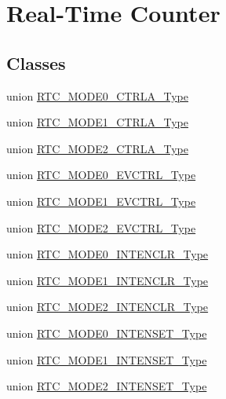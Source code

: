 \hypertarget{group___s_a_m_l21___r_t_c}{}\section{Real-\/\+Time Counter}
\label{group___s_a_m_l21___r_t_c}
\subsection*{Classes}
\begin{DoxyCompactItemize}
\item 
union \hyperlink{union_r_t_c___m_o_d_e0___c_t_r_l_a___type}{R\+T\+C\+\_\+\+M\+O\+D\+E0\+\_\+\+C\+T\+R\+L\+A\+\_\+\+Type}
\item 
union \hyperlink{union_r_t_c___m_o_d_e1___c_t_r_l_a___type}{R\+T\+C\+\_\+\+M\+O\+D\+E1\+\_\+\+C\+T\+R\+L\+A\+\_\+\+Type}
\item 
union \hyperlink{union_r_t_c___m_o_d_e2___c_t_r_l_a___type}{R\+T\+C\+\_\+\+M\+O\+D\+E2\+\_\+\+C\+T\+R\+L\+A\+\_\+\+Type}
\item 
union \hyperlink{union_r_t_c___m_o_d_e0___e_v_c_t_r_l___type}{R\+T\+C\+\_\+\+M\+O\+D\+E0\+\_\+\+E\+V\+C\+T\+R\+L\+\_\+\+Type}
\item 
union \hyperlink{union_r_t_c___m_o_d_e1___e_v_c_t_r_l___type}{R\+T\+C\+\_\+\+M\+O\+D\+E1\+\_\+\+E\+V\+C\+T\+R\+L\+\_\+\+Type}
\item 
union \hyperlink{union_r_t_c___m_o_d_e2___e_v_c_t_r_l___type}{R\+T\+C\+\_\+\+M\+O\+D\+E2\+\_\+\+E\+V\+C\+T\+R\+L\+\_\+\+Type}
\item 
union \hyperlink{union_r_t_c___m_o_d_e0___i_n_t_e_n_c_l_r___type}{R\+T\+C\+\_\+\+M\+O\+D\+E0\+\_\+\+I\+N\+T\+E\+N\+C\+L\+R\+\_\+\+Type}
\item 
union \hyperlink{union_r_t_c___m_o_d_e1___i_n_t_e_n_c_l_r___type}{R\+T\+C\+\_\+\+M\+O\+D\+E1\+\_\+\+I\+N\+T\+E\+N\+C\+L\+R\+\_\+\+Type}
\item 
union \hyperlink{union_r_t_c___m_o_d_e2___i_n_t_e_n_c_l_r___type}{R\+T\+C\+\_\+\+M\+O\+D\+E2\+\_\+\+I\+N\+T\+E\+N\+C\+L\+R\+\_\+\+Type}
\item 
union \hyperlink{union_r_t_c___m_o_d_e0___i_n_t_e_n_s_e_t___type}{R\+T\+C\+\_\+\+M\+O\+D\+E0\+\_\+\+I\+N\+T\+E\+N\+S\+E\+T\+\_\+\+Type}
\item 
union \hyperlink{union_r_t_c___m_o_d_e1___i_n_t_e_n_s_e_t___type}{R\+T\+C\+\_\+\+M\+O\+D\+E1\+\_\+\+I\+N\+T\+E\+N\+S\+E\+T\+\_\+\+Type}
\item 
union \hyperlink{union_r_t_c___m_o_d_e2___i_n_t_e_n_s_e_t___type}{R\+T\+C\+\_\+\+M\+O\+D\+E2\+\_\+\+I\+N\+T\+E\+N\+S\+E\+T\+\_\+\+Type}

\end{DoxyCompactItemize}
